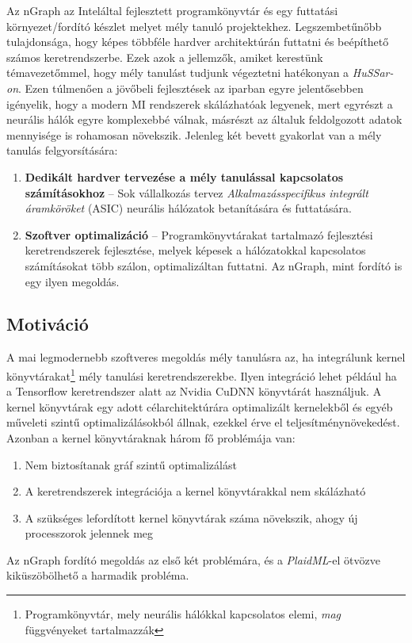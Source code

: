 Az nGraph az Intel\registeredlogo által fejlesztett programkönyvtár és egy futtatási környezet/fordító készlet melyet mély tanuló projektekhez.
Legszembetűnőbb tulajdonsága, hogy képes többféle hardver architektúrán futtatni és beépíthető számos keretrendszerbe.
Ezek azok a jellemzők, amiket kerestünk témavezetőmmel, hogy mély tanulást tudjunk végeztetni hatékonyan a \emph{HuSSar-on}. 
Ezen túlmenően a jövőbeli fejlesztések az iparban egyre jelentősebben igényelik, hogy a modern MI rendszerek skálázhatóak legyenek, mert egyrészt a neurális hálók egyre komplexebbé válnak, másrészt az általuk feldolgozott adatok mennyisége is rohamosan növekszik. Jelenleg két bevett gyakorlat van a mély tanulás felgyorsítására:
\begin{enumerate}[noitemsep]
	\item \textbf{Dedikált hardver tervezése a mély tanulással kapcsolatos számításokhoz} -- Sok vállalkozás tervez \emph{Alkalmazásspecifikus integrált áramköröket} (ASIC) neurális hálózatok betanítására és futtatására.
	\item \textbf{Szoftver optimalizáció} -- Programkönyvtárakat tartalmazó fejlesztési keretrendszerek fejlesztése, melyek képesek a hálózatokkal kapcsolatos számításokat több szálon, optimalizáltan futtatni. Az nGraph, mint fordító is egy ilyen megoldás.
\end{enumerate}

\subsection{Motiváció}
A mai legmodernebb szoftveres megoldás mély tanulásra az, ha integrálunk kernel könyvtárakat\footnote{Programkönyvtár, mely neurális hálókkal kapcsolatos elemi, \emph{mag} függvényeket tartalmazzák} mély tanulási keretrendszerekbe.
Ilyen integráció lehet például ha a Tensorflow keretrendszer alatt az Nvidia CuDNN könyvtárát használjuk.
A {kernel könyvtárak} egy adott célarchitektúrára optimalizált kernelekből és egyéb műveleti szintű optimalizálásokból állnak, ezekkel érve el teljesítménynövekedést.
Azonban a kernel könyvtáraknak három fő problémája van:
\begin{enumerate}
	\item Nem biztosítanak gráf szintű optimalizálást
	\item A keretrendszerek integrációja a {kernel könyvtárakkal} nem skálázható
	\item A szükséges lefordított kernel könyvtárak száma növekszik, ahogy új processzorok jelennek meg
\end{enumerate}
Az nGraph fordító megoldás az első két problémára, és a \emph{PlaidML}-el ötvözve kiküszöbölhető a harmadik probléma.
